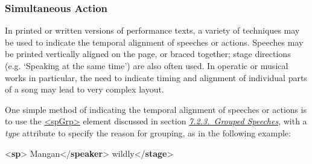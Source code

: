 \subsubsection[{Simultaneous Action}]{Simultaneous Action}\label{DRSIM}\par
In printed or written versions of performance texts, a variety of techniques may be used to indicate the temporal alignment of speeches or actions. Speeches may be printed vertically aligned on the page, or braced together; stage directions (e.g. ‘Speaking at the same time’) are also often used. In operatic or musical works in particular, the need to indicate timing and alignment of individual parts of a song may lead to very complex layout.\par
One simple method of indicating the temporal alignment of speeches or actions is to use the \hyperref[TEI.spGrp]{<spGrp>} element discussed in section \textit{\hyperref[DRSPG]{7.2.3.\ Grouped Speeches}}, with a {\itshape type} attribute to specify the reason for grouping, as in the following example: \par\bgroup{}\exampleFont \begin{shaded}\noindent\mbox{}{<\textbf{sp}>}\mbox{}\newline 
{}Mangan{</\textbf{speaker}>}\mbox{}\newline 
{}wildly{</\textbf{stage}>}\mbox{}\newline 

\end{shaded}
